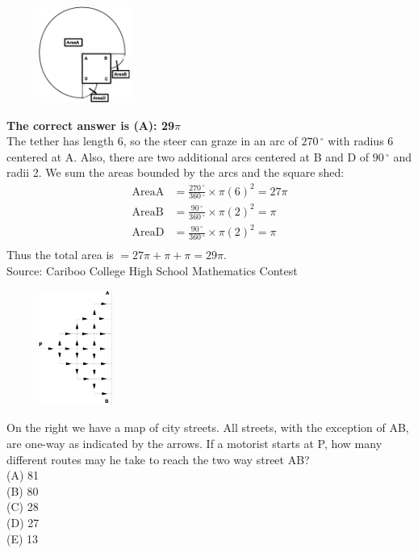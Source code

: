 \documentclass{article}
\begin{document}
\begin{figure}
	\includegraphics[width=30mm,viewport=18 63 532 603]{CCJPR73-24pic2.eps}
\end{figure}

\textbf{The correct answer is (A): 29$\pi$}\\[1 ex]
The tether has length 6, so the steer can graze in an arc of $270\,^{\circ}$ with radius 6 centered at A.  Also, there are two additional arcs centered at B and D of $90\,^{\circ}$ and radii 2.
We sum the areas bounded by the arcs and the square shed:
\begin{align*} 
\textrm{AreaA} &=\frac{270\,^{\circ}}{360\,^{\circ}}\times\pi(6)^2=27\pi\\
\textrm{AreaB} &=\frac{90\,^{\circ}}{360\,^{\circ}}\times\pi(2)^2=\pi\\
\textrm{AreaD} &=\frac{90\,^{\circ}}{360\,^{\circ}}\times\pi(2)^2=\pi\\
\end{align*}
Thus the total area is $=27\pi+\pi+\pi=29\pi$.
\\[5 ex]

\scriptsize
Source: Cariboo College High School Mathematics Contest

\normalsize
\begin{figure}
	\includegraphics[width=24mm,viewport=86 21 486 641]{CCJPR73-25pic1.eps}
\end{figure}
On the right we have a map of city streets. All streets, with the exception of AB, are one-way as indicated by the arrows. If a motorist starts at P, how many different routes may he take to reach the two way street AB?\\
(A) 81\\
(B) 80\\
(C) 28\\
(D) 27\\
(E) 13\\
\end{document}

